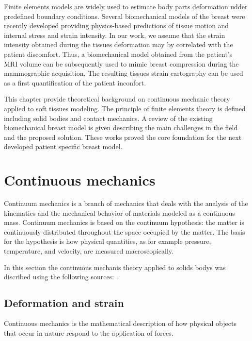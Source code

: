 

Finite elements models are widely used to estimate body parts deformation udder predefined boundary conditions. Several biomechanical models of the breast were recently developed providing physics-based predictions of tissue motion and internal stress and strain intensity.  In our work, we assume that the strain intensity obtained during the tissues deformation may by correlated with the patient discomfort. Thus, a biomechanical model obtained from the patient's MRI volume can be subsequently used to mimic breast compression during the mammographic acquisition. The resulting tissues strain cartography can be used as a first quantification of the patient inconfort.

This chapter provide theoretical background on continuous mechanic theory applied to soft tissues modeling. The principle of finite elements theory is defined including solid bodies and contact mechanics. A review of the existing biomechanical breast model is given describing the main challenges in the field and the proposed solution. These works proved the core foundation for the next developed patient specific breast model. 
      
\clearpage
\section{Continuous mechanics}
\label{section:continuousmechanics}
Continuum mechanics is a branch of mechanics that deals with the analysis of the kinematics and the mechanical behavior of materials modeled as a continuous mass. Continuum mechanics is based on the continuum hypothesis: the matter is continuously distributed throughout the space occupied by the matter. The basis for the hypothesis is how physical quantities, as for example pressure, temperature, and velocity, are measured macroscopically.

In this section the continuous mechanis theory applied to solids bodys was discribed using the following sources: \cite{belytschko_nonlinear_2013,abeyaratne_continuum_2012}.
\subsection{Deformation and strain}\label{subsection:defromationandstrain}
Continuous mechanics is the mathematical description of how physical objects that occur in nature respond to the application of forces.

